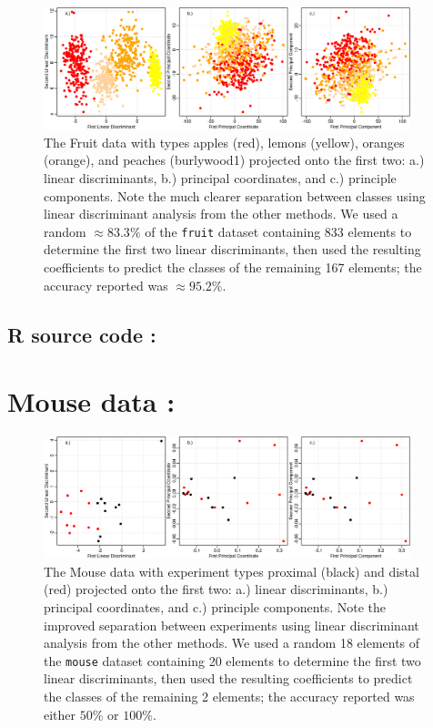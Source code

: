 \begin{figure}[H]
  \centering
    \includegraphics[width=0.95\textwidth]{images/fruit.png}
  \caption{The Fruit data with types apples (red), lemons (yellow), oranges (orange), and peaches (burlywood1) projected onto the first two: a.) linear discriminants, b.) principal coordinates, and c.) principle components.  Note the much clearer separation between classes using linear discriminant analysis from the other methods.  We used a random $\approx 83.3\%$ of the \texttt{fruit} dataset containing 833 elements to determine the first two linear discriminants, then used the resulting coefficients to predict the classes of the remaining 167 elements; the accuracy reported was $\approx 95.2\%$.}
\end{figure}

\subsection{R source code :}

\begin{multicols}{2}


\end{multicols}

\newpage

\section{Mouse data :}

\begin{figure}[H]
  \centering
    \includegraphics[width=0.95\textwidth]{images/mouse_experiment.png}
  \caption{The Mouse data with experiment types proximal (black) and distal (red) projected onto the first two: a.) linear discriminants, b.) principal coordinates, and c.) principle components.  Note the improved separation between experiments using linear discriminant analysis from the other methods.  We used a random 18 elements of the \texttt{mouse} dataset containing 20 elements to determine the first two linear discriminants, then used the resulting coefficients to predict the classes of the remaining 2 elements; the accuracy reported was either $50\%$ or $100\%$.}
\end{figure}

